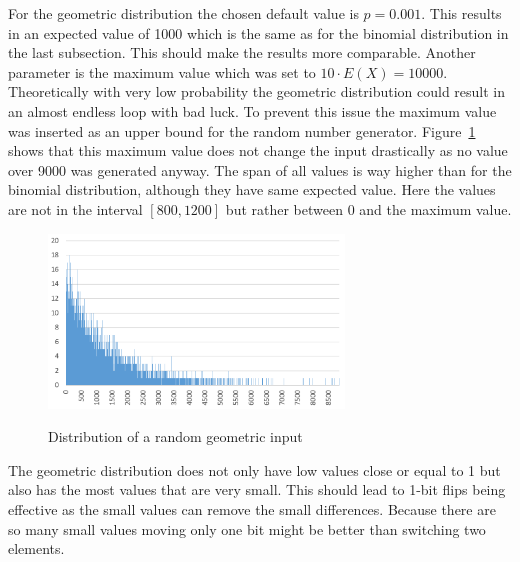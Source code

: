 For the geometric distribution the chosen default value is $p=0.001$.
This results in an expected value of 1000 which is the same as for the binomial distribution in the last subsection.
This should make the results more comparable.
Another parameter is the maximum value which was set to $10 \cdot E(X)=10000$.
Theoretically with very low probability the geometric distribution could result in an almost endless loop with bad luck.
To prevent this issue the maximum value was inserted as an upper bound for the random number generator. 
Figure~\ref{fig:geoDistExample} shows that this maximum value does not change the input drastically as no value over 9000 was generated anyway.
The span of all values is way higher than for the binomial distribution, although they have same expected value.
Here the values are not in the interval $[800,1200]$ but rather between 0 and the maximum value. 

\begin{figure}[h]
      \caption{Distribution of a random geometric input}
      \centering
      \includegraphics[width=0.7\textwidth]{figures/images/numberGenerator/geometricDistributionForp0_001.png}\label{fig:geoDistExample}
\end{figure}

The geometric distribution does not only have low values close or equal to 1 but also has the most values that are very small.
This should lead to 1-bit flips being effective as the small values can remove the small differences. Because there are so many small values moving only one bit might be better than switching two elements.  